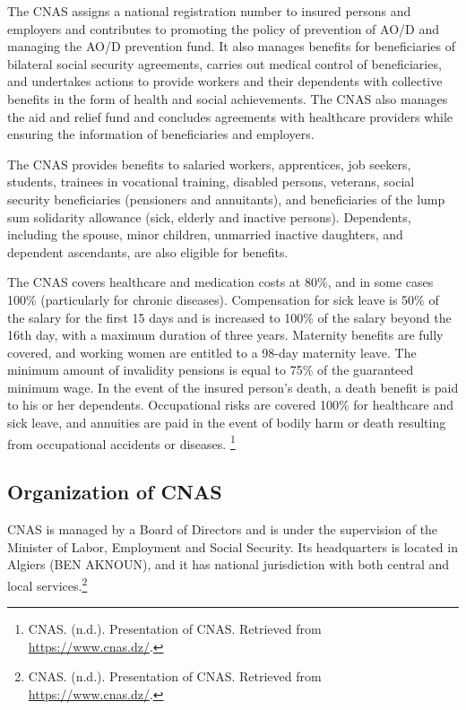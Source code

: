 The CNAS assigns a national registration number to insured persons and employers and contributes to promoting the policy of prevention of AO/D and managing the AO/D prevention fund. It also manages benefits for beneficiaries of bilateral social security agreements, carries out medical control of beneficiaries, and undertakes actions to provide workers and their dependents with collective benefits in the form of health and social achievements. The CNAS also manages the aid and relief fund and concludes agreements with healthcare providers while ensuring the information of beneficiaries and employers.

The CNAS provides benefits to salaried workers, apprentices, job seekers, students, trainees in vocational training, disabled persons, veterans, social security beneficiaries (pensioners and annuitants), and beneficiaries of the lump sum solidarity allowance (sick, elderly and inactive persons). Dependents, including the spouse, minor children, unmarried inactive daughters, and dependent ascendants, are also eligible for benefits.

The CNAS covers healthcare and medication costs at 80\%, and in some cases 100\% (particularly for chronic diseases). Compensation for sick leave is 50\% of the salary for the first 15 days and is increased to 100\% of the salary beyond the 16th day, with a maximum duration of three years. Maternity benefits are fully covered, and working women are entitled to a 98-day maternity leave. The minimum amount of invalidity pensions is equal to 75\% of the guaranteed minimum wage. In the event of the insured person's death, a death benefit is paid to his or her dependents. Occupational risks are covered 100\% for healthcare and sick leave, and annuities are paid in the event of bodily harm or death resulting from occupational accidents or diseases.
\footnote{CNAS. (n.d.). Presentation of CNAS. Retrieved from \url{https://www.cnas.dz/}.}
\subsection{Organization of CNAS}
CNAS is managed by a Board of Directors and is under the supervision of the Minister of Labor, Employment and Social Security. Its headquarters is located in Algiers (BEN AKNOUN), and it has national jurisdiction with both central and local services.\footnote{CNAS. (n.d.). Presentation of CNAS. Retrieved from \url{https://www.cnas.dz/}.}

